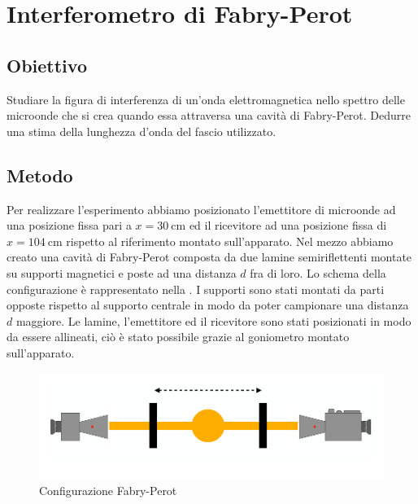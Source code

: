 \documentclass[a4paper]{article}
\begin{document}
\section{Interferometro di Fabry-Perot}
\subsection{Obiettivo}
Studiare la figura di interferenza di un'onda elettromagnetica nello spettro delle microonde che si crea quando essa attraversa una cavità di Fabry-Perot. Dedurre una stima della lunghezza d'onda del fascio utilizzato.
\subsection{Metodo}
Per realizzare l'esperimento abbiamo posizionato l'emettitore di microonde ad una posizione fissa pari a $x=\SI{30}{\centi\metre}$ ed il ricevitore ad una posizione fissa di $x=\SI{104}{\centi\metre}$ rispetto al riferimento montato sull'apparato. Nel mezzo abbiamo creato una cavità di Fabry-Perot composta da due lamine semiriflettenti montate su supporti magnetici e poste ad una distanza $d$ fra di loro. Lo schema della configurazione è rappresentato nella . I supporti sono stati montati da parti opposte rispetto al supporto centrale in modo da poter campionare una distanza $d$ maggiore. Le lamine, l'emettitore ed il ricevitore sono stati posizionati in modo da essere allineati, ciò è stato possibile grazie al goniometro montato sull'apparato.
\begin{figure}[H]
    \centering
    \includegraphics[width=0.7\linewidth]{grafici/Fabry-Perot_configurazione.png}
    \caption{Configurazione Fabry-Perot}
    \label{fig:Configurazione_Fabry_Perot}
\end{figure}
\end{document}
